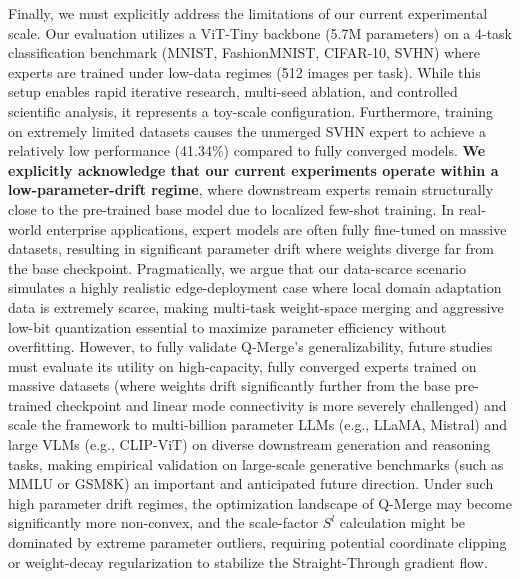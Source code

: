 Finally, we must explicitly address the limitations of our current experimental scale. Our evaluation utilizes a ViT-Tiny backbone (5.7M parameters) on a 4-task classification benchmark (MNIST, FashionMNIST, CIFAR-10, SVHN) where experts are trained under low-data regimes (512 images per task). While this setup enables rapid iterative research, multi-seed ablation, and controlled scientific analysis, it represents a toy-scale configuration. Furthermore, training on extremely limited datasets causes the unmerged SVHN expert to achieve a relatively low performance (41.34\%) compared to fully converged models. \textbf{We explicitly acknowledge that our current experiments operate within a low-parameter-drift regime}, where downstream experts remain structurally close to the pre-trained base model due to localized few-shot training. In real-world enterprise applications, expert models are often fully fine-tuned on massive datasets, resulting in significant parameter drift where weights diverge far from the base checkpoint. Pragmatically, we argue that our data-scarce scenario simulates a highly realistic edge-deployment case where local domain adaptation data is extremely scarce, making multi-task weight-space merging and aggressive low-bit quantization essential to maximize parameter efficiency without overfitting. However, to fully validate Q-Merge's generalizability, future studies must evaluate its utility on high-capacity, fully converged experts trained on massive datasets (where weights drift significantly further from the base pre-trained checkpoint and linear mode connectivity is more severely challenged) and scale the framework to multi-billion parameter LLMs (e.g., LLaMA, Mistral) and large VLMs (e.g., CLIP-ViT) on diverse downstream generation and reasoning tasks, making empirical validation on large-scale generative benchmarks (such as MMLU or GSM8K) an important and anticipated future direction. Under such high parameter drift regimes, the optimization landscape of Q-Merge may become significantly more non-convex, and the scale-factor $S^l$ calculation might be dominated by extreme parameter outliers, requiring potential coordinate clipping or weight-decay regularization to stabilize the Straight-Through gradient flow.